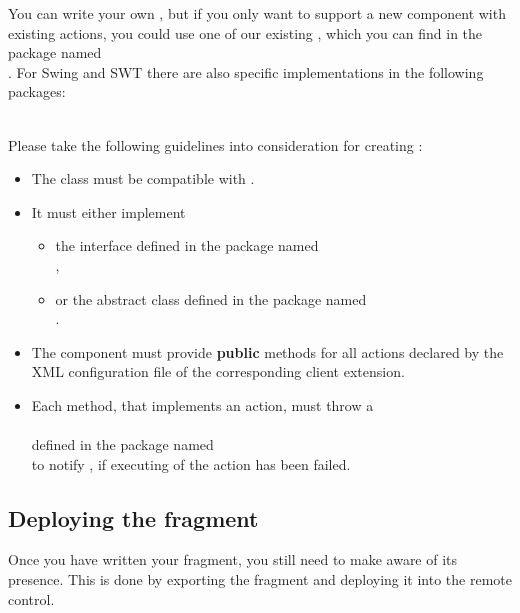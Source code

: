 You can write your own \gdtesterclasses, but if you only want to support a new
component with existing actions, you could use one of our existing
\gdtesterclasses, which you can find in the package named\\
. For Swing and SWT there are also
specific implementations in the following packages:\\
\\

Please take the following guidelines into consideration for creating
\gdtesterclasses:
\begin{itemize}
  \item The class must be compatible with .
  \item It must either implement
  \begin{itemize}
    \item the interface  defined in the package named\\
        ,\\
	 \item or the abstract class 
	     defined in the package named\\
	     .
  \end{itemize}
  \item The component must provide \textbf{public} methods for all actions
        declared by the XML configuration file of the corresponding \app{}
        client extension.
  \item Each method, that implements an action, must throw a\\
        \\
        defined in the package named\\
        to notify \app{}, if executing of the action has been failed.
\end{itemize}

\subsection{Deploying the fragment}

Once you have written your fragment, you still need to make \app{}
aware of its presence. This is done by exporting the fragment and
deploying it into the \app{} remote control.


